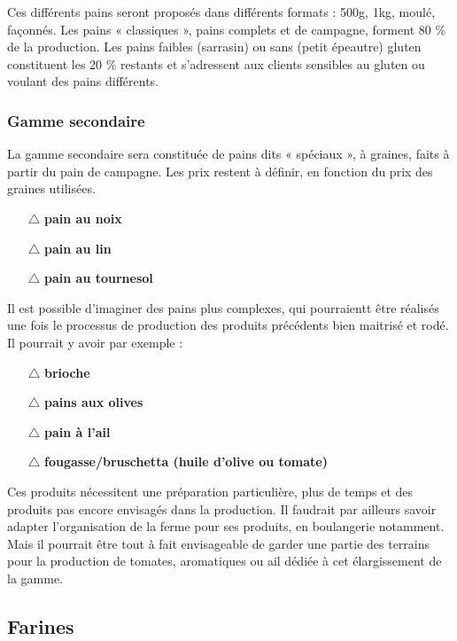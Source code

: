 \documentclass{book}
\begin{document}
Ces différents pains seront proposés dans différents formats : 500g, 1kg, moulé, façonnés. Les pains « classiques », pains complets et de campagne, forment 80 \% de la production. Les pains faibles (sarrasin) ou sans (petit épeautre) gluten constituent les 20 \% restants et s’adressent aux clients sensibles au gluten ou voulant des pains différents. 

\subsubsection{Gamme secondaire}

La gamme secondaire sera constituée de pains dits « spéciaux », à graines, faits à partir du pain de campagne. Les prix restent à définir, en fonction du prix des graines utilisées. 
\begin{itemize}

	\item[$\triangle$] \textbf{pain au noix}
	\item[$\triangle$] \textbf{pain au lin}
	\item[$\triangle$] \textbf{pain au tournesol}

\end{itemize}
      
Il est possible d’imaginer des pains plus complexes, qui pourraientt être réalisés une fois le processus de production des produits précédents bien maitrisé et rodé. Il pourrait y avoir par exemple :
\begin{itemize}

	\item[$\triangle$] \textbf{brioche}
	\item[$\triangle$] \textbf{pains aux olives}
	\item[$\triangle$] \textbf{pain à l’ail}
	\item[$\triangle$] \textbf{fougasse/bruschetta (huile d’olive ou tomate)}

\end{itemize}
Ces produits nécessitent une préparation particulière, plus de temps et des produits pas encore envisagés dans la production. Il faudrait par ailleurs savoir adapter l’organisation de la ferme pour ses produits, en boulangerie notamment. Mais il pourrait être tout à fait envisageable de garder une partie des terrains pour la production de tomates, aromatiques ou ail dédiée à cet élargissement de la gamme.

\subsection{Farines}
\end{document}
